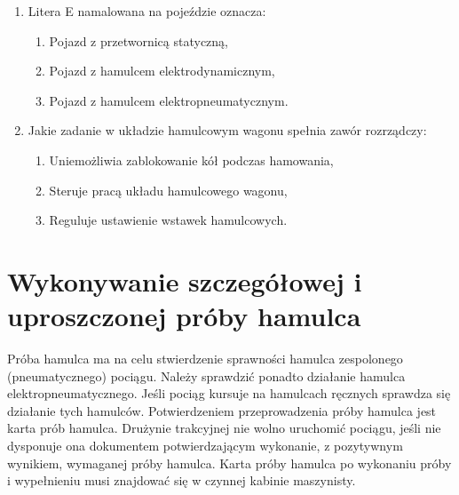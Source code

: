 \begin{tcolorbox}[colback=black!5!white,colframe=white!55!black,title=Sprawdźmy się]
	\begin{enumerate}
	\item Litera E namalowana na pojeździe oznacza:
	\begin{enumerate}
		\item Pojazd z przetwornicą statyczną,
		\item Pojazd z hamulcem elektrodynamicznym,
		\item Pojazd z hamulcem elektropneumatycznym.
	\end{enumerate}	
	\item Jakie zadanie w układzie hamulcowym wagonu spełnia zawór rozrządczy:
	\begin{enumerate}
		\item Uniemożliwia zablokowanie kół podczas hamowania,
		\item Steruje pracą układu hamulcowego wagonu,
		\item Reguluje ustawienie wstawek hamulcowych.
	\end{enumerate}
	\end{enumerate}
\end{tcolorbox}

\chapter{Wykonywanie szczegółowej i uproszczonej próby hamulca}

Próba hamulca ma na celu stwierdzenie sprawności hamulca zespolonego (pneumatycznego) pociągu. Należy sprawdzić ponadto działanie hamulca elektropneumatycznego. Jeśli pociąg kursuje na hamulcach ręcznych sprawdza się działanie tych hamulców. Potwierdzeniem przeprowadzenia próby hamulca jest karta prób hamulca. Drużynie trakcyjnej nie wolno uruchomić pociągu, jeśli nie dysponuje ona dokumentem potwierdzającym wykonanie, z pozytywnym wynikiem, wymaganej próby hamulca.
Karta próby hamulca po wykonaniu próby i wypełnieniu musi znajdować się w czynnej kabinie maszynisty.


